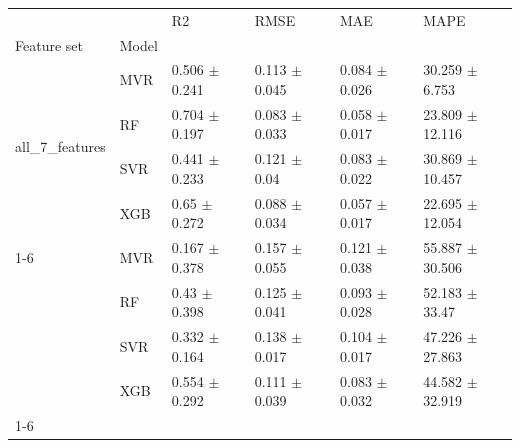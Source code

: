 \begin{tabular}{llllll}
\toprule
 &  & R2 & RMSE & MAE & MAPE \\
Feature set & Model &  &  &  &  \\
\midrule
\multirow[t]{4}{*}{all_7_features} & MVR & 0.506 $\pm$ 0.241 & 0.113 $\pm$ 0.045 & 0.084 $\pm$ 0.026 & 30.259 $\pm$ 6.753 \\
 & RF & 0.704 $\pm$ 0.197 & 0.083 $\pm$ 0.033 & 0.058 $\pm$ 0.017 & 23.809 $\pm$ 12.116 \\
 & SVR & 0.441 $\pm$ 0.233 & 0.121 $\pm$ 0.04 & 0.083 $\pm$ 0.022 & 30.869 $\pm$ 10.457 \\
 & XGB & 0.65 $\pm$ 0.272 & 0.088 $\pm$ 0.034 & 0.057 $\pm$ 0.017 & 22.695 $\pm$ 12.054 \\
\cline{1-6}
\multirow[t]{4}{*}{geometry_only} & MVR & 0.167 $\pm$ 0.378 & 0.157 $\pm$ 0.055 & 0.121 $\pm$ 0.038 & 55.887 $\pm$ 30.506 \\
 & RF & 0.43 $\pm$ 0.398 & 0.125 $\pm$ 0.041 & 0.093 $\pm$ 0.028 & 52.183 $\pm$ 33.47 \\
 & SVR & 0.332 $\pm$ 0.164 & 0.138 $\pm$ 0.017 & 0.104 $\pm$ 0.017 & 47.226 $\pm$ 27.863 \\
 & XGB & 0.554 $\pm$ 0.292 & 0.111 $\pm$ 0.039 & 0.083 $\pm$ 0.032 & 44.582 $\pm$ 32.919 \\
\cline{1-6}
\bottomrule
\end{tabular}
